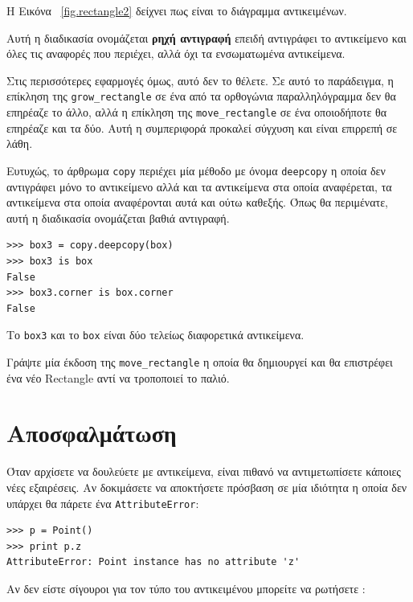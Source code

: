 \documentclass[10pt]{book}
\begin{document}
 Η Εικόνα~ \ref{fig.rectangle2}  δείχνει πως είναι το διάγραμμα αντικειμένων.

 Αυτή η διαδικασία ονομάζεται {\bf ρηχή αντιγραφή} επειδή αντιγράφει το αντικείμενο και όλες τις αναφορές που περιέχει, 
αλλά όχι τα ενσωματωμένα αντικείμενα.

Στις περισσότερες εφαρμογές όμως, αυτό δεν το θέλετε.  Σε αυτό το παράδειγμα, η επίκληση της  \verb"grow_rectangle"  σε 
ένα από τα ορθογώνια παραλληλόγραμμα δεν θα επηρέαζε το άλλο, αλλά η επίκληση της  \verb"move_rectangle"  σε ένα οποιοδήποτε 
θα επηρέαζε και τα δύο. Αυτή η συμπεριφορά προκαλεί σύγχυση και είναι επιρρεπή σε λάθη.

Ευτυχώς, το άρθρωμα  {\tt copy}  περιέχει μία μέθοδο με όνομα  {\tt deepcopy}  η οποία δεν αντιγράφει μόνο το αντικείμενο αλλά και τα αντικείμενα στα οποία αναφέρεται, τα αντικείμενα στα οποία αναφέρονται αυτά και ούτω καθεξής.
Όπως θα περιμένατε, αυτή η διαδικασία ονομάζεται βαθιά αντιγραφή. 

\begin{verbatim}
>>> box3 = copy.deepcopy(box)
>>> box3 is box
False
>>> box3.corner is box.corner
False
\end{verbatim}
%
 Το  {\tt box3}  και το  {\tt box}  είναι δύο τελείως διαφορετικά αντικείμενα.


\begin{exercise}

Γράψτε μία έκδοση της  \verb"move_rectangle"  η οποία θα δημιουργεί και θα επιστρέφει ένα νέο  Rectangle  
αντί να τροποποιεί το παλιό.
\end{exercise}



\section{Αποσφαλμάτωση}
\label{hasattr}

Όταν αρχίσετε να δουλεύετε με αντικείμενα, είναι πιθανό να αντιμετωπίσετε κάποιες νέες εξαιρέσεις. Αν δοκιμάσετε να αποκτήσετε πρόσβαση σε μία ιδιότητα η οποία δεν υπάρχει θα πάρετε 
ένα  {\tt AttributeError}:

\begin{verbatim}
>>> p = Point()
>>> print p.z
AttributeError: Point instance has no attribute 'z'
\end{verbatim}
%
 Αν δεν είστε σίγουροι για τον τύπο του αντικειμένου μπορείτε να ρωτήσετε :
\end{document}
